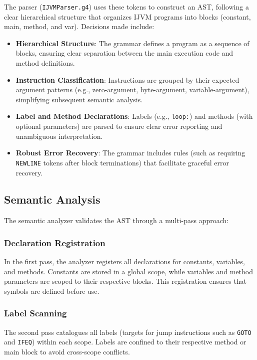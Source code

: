 \documentclass[11pt]{article}
\begin{document}
The parser (\texttt{IJVMParser.g4}) uses these tokens to construct an AST, following a clear hierarchical structure that organizes IJVM programs into blocks (constant, main, method, and var). Decisions made include:

\begin{itemize}
    \item \textbf{Hierarchical Structure}: The grammar defines a program as a sequence of blocks, ensuring clear separation between the main execution code and method definitions.
    \item \textbf{Instruction Classification}: Instructions are grouped by their expected argument patterns (e.g., zero-argument, byte-argument, variable-argument), simplifying subsequent semantic analysis.
    \item \textbf{Label and Method Declarations}: Labels (e.g., \texttt{loop:}) and methods (with optional parameters) are parsed to ensure clear error reporting and unambiguous interpretation.
    \item \textbf{Robust Error Recovery}: The grammar includes rules (such as requiring \texttt{NEWLINE} tokens after block terminations) that facilitate graceful error recovery.
\end{itemize}

\subsection{Semantic Analysis}
The semantic analyzer validates the AST through a multi-pass approach:

\subsubsection{Declaration Registration}
In the first pass, the analyzer registers all declarations for constants, variables, and methods. Constants are stored in a global scope, while variables and method parameters are scoped to their respective blocks. This registration ensures that symbols are defined before use.

\subsubsection{Label Scanning}
The second pass catalogues all labels (targets for jump instructions such as \texttt{GOTO} and \texttt{IFEQ}) within each scope. Labels are confined to their respective method or main block to avoid cross-scope conflicts.
\end{document}
